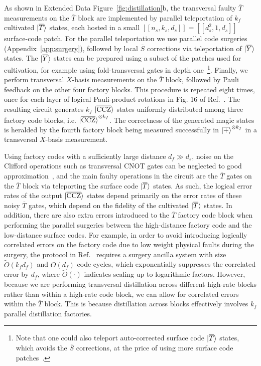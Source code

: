 \documentclass[reprint,twocolumn,secnumarabic,amssymb, aps, prx]{revtex4-2}
\newcommand{\kf}{k_f}
\newcommand{\df}{d_f}
\newcommand{\ns}{n_s}
\newcommand{\ks}{k_s}
\newcommand{\ds}{d_s}
\newcommand{\lket}[1]{\ket{\overline{#1}}}
\newcommand{\ccz}{\ket{\overline{\text{CCZ}}}}
\begin{document}
As shown in Extended Data Figure~\ref{fig:distillation}b, the transversal faulty $\overline{T}$ measurements on the $\overline{T}$ block are implemented by parallel teleportation of $\kf$ cultivated $\lket{T}$ states, each hosted in a small $[[\ns, \ks, \ds]] = [[\ds^2, 1, \ds]]$ surface-code patch. For the parallel teleportation we use parallel code surgeries~\cite{zhang2025constant} (Appendix~\ref{app:surgery}), followed by local $\overline{S}$ corrections via teleportation of $\lket{Y}$ states. The $\lket{Y}$ states can be prepared using a subset of the patches used for cultivation, for example using fold-transversal gates in depth one~\footnote{Note that one could also teleport auto-corrected surface code $\lket{T}$ states, which avoids the $\overline{S}$ corrections, at the price of using more surface code patches~\cite{litinski2019magic}.}. Finally, we perform transversal $X$-basis measurements on the $\overline{T}$ block, followed by Pauli feedback on the other four factory blocks. This procedure is repeated eight times, once for each layer of logical Pauli-product rotations in Fig. 16 of Ref.~\cite{litinski2019magic}. The resulting circuit generates $\kf$ $\ccz$ states uniformly distributed among three factory code blocks, i.e. $\ccz^{\otimes \kf}$. The correctness of the generated magic states is heralded by the fourth factory block being measured successfully in $\lket{+}^{\otimes \kf}$ in a transversal $X$-basis measurement.

Using factory codes with a sufficiently large distance \mbox{$\df \gg \ds$}, noise on the Clifford operations such as transversal CNOT gates can be neglected to good approximation~\cite{litinski2019magic}, and the main faulty operations in the circuit are the $\overline{T}$ gates on the $\overline{T}$ block via teleporting the surface code $\lket{T}$ states. As such, the logical error rates of the output $\ccz$ states depend primarily on the error rates of these noisy $\overline{T}$ gates, which depend on the fidelity of the cultivated $\lket{T}$ states. In addition, there are also extra errors introduced to the $\overline{T}$ factory code block when performing the parallel surgeries between the high-distance factory code and the low-distance surface codes. For example, in order to avoid introducing logically correlated errors on the factory code due to low weight physical faults during the surgery, the protocol in Ref.~\cite{zhang2025constant} requires a surgery ancilla system with size $\tilde{O}(\kf \df)$ and $O(\df)$ code cycles, which exponentially suppresses the correlated error by $\df$, where $\tilde{O}(\cdot)$ indicates scaling up to logarithmic factors. However, because we are performing transversal distillation across different high-rate blocks rather than within a high-rate code block, we can allow for correlated errors within the $\overline{T}$ block. This is because distillation across blocks effectively involves $\kf$ parallel distillation factories.
\end{document}
